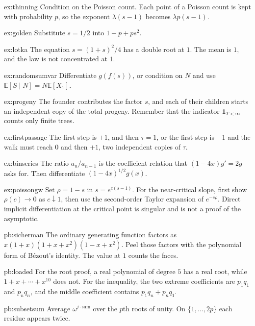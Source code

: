 \begin{hint}{ex:thinning}
Condition on the Poisson count. Each point of a Poisson count is kept with probability $p$, so the exponent $\lambda(s-1)$ becomes $\lambda p(s-1)$.
\end{hint}
\begin{hint}{ex:golden}
Substitute $s=1/2$ into $1-p+ps^2$.
\end{hint}
\begin{hint}{ex:lotka}
The equation $s=(1+s)^2/4$ has a double root at $1$. The mean is $1$, and the law is not concentrated at $1$.
\end{hint}
\begin{hint}{ex:randomsumvar}
Differentiate $g(f(s))$, or condition on $N$ and use $\mathbb E[S\mid N]=N\mathbb E[X_1]$.
\end{hint}
\begin{hint}{ex:progeny}
The founder contributes the factor $s$, and each of their children starts an independent copy of the total progeny. Remember that the indicator $\mathbf 1_{T<\infty}$ counts only finite trees.
\end{hint}
\begin{hint}{ex:firstpassage}
The first step is $+1$, and then $\tau=1$, or the first step is $-1$ and the walk must reach $0$ and then $+1$, two independent copies of $\tau$.
\end{hint}
\begin{hint}{ex:binseries}
The ratio $a_n/a_{n-1}$ is the coefficient relation that $(1-4x)g'=2g$ asks for. Then differentiate $(1-4x)^{1/2}g(x)$.
\end{hint}
\begin{hint}{ex:poissongw}
Set $\rho=1-s$ in $s=e^{c(s-1)}$. For the near-critical slope, first show $\rho(c)\to0$ as $c\downarrow1$, then use the second-order Taylor expansion of $e^{-c\rho}$. Direct implicit differentiation at the critical point is singular and is not a proof of the asymptotic.
\end{hint}


\begin{hint}{pb:sicherman}
The ordinary generating function factors as $x(1+x)(1+x+x^2)(1-x+x^2)$. Peel those factors with the polynomial form of Bézout's identity. The value at $1$ counts the faces.
\end{hint}
\begin{hint}{pb:loaded}
For the root proof, a real polynomial of degree $5$ has a real root, while $1+x+\cdots+x^{10}$ does not. For the inequality, the two extreme coefficients are $p_1q_1$ and $p_nq_n$, and the middle coefficient contains $p_1q_n+p_nq_1$.
\end{hint}
\begin{hint}{pb:subsetsum}
Average $\omega^{j\cdot\text{sum}}$ over the $p$th roots of unity. On $\{1,\ldots,2p\}$ each residue appears twice.
\end{hint}

